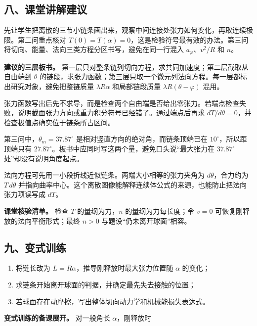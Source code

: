 \documentclass[12pt,a4paper,UTF8]{ctexart}
\newcommand{\tightlist}{\setlength{\itemsep}{0pt}\setlength{\parskip}{0pt}}
\begin{document}
\subsection{八、课堂讲解建议}\label{ux516bux8bfeux5802ux8bb2ux89e3ux5efaux8bae-6}

先让学生把离散的三节小链条画出来，观察中间连接处张力如何变化，再取连续极限。第二问重点核对
\(T(0)=T(\alpha)=0\)，这是检验符号最有效的办法。第三问将切向、能量、法向三类方程分区书写，避免在同一行混入
\(a_\varphi\)、\(v^2/R\) 和 \(n\)。

\textbf{建议的三层板书。}
第一层只对整条链列切向方程，求共同加速度；第二层截取从自由端到
\(\theta\)
的链段，求张力函数；第三层只取一个微元列法向方程。每一层都标出研究对象，避免把整链质量
\(\lambda R\alpha\) 和局部链段质量 \(\lambda R(\theta-\varphi)\) 混用。

张力函数写出后先不求导，而是检查两个自由端是否给出零张力。若端点检查失败，说明截面张力方向或重力积分符号已经错了。通过端点后再求
\(dT/d\theta=0\)，并检查极值点确实位于链条所占区间。

第三问中，\(\theta_m=37.87^\circ\)
是相对竖直方向的绝对角，而链条顶端已在 \(10^\circ\)，所以距顶端只有
\(27.87^\circ\)。板书中应同时写这两个量，避免口头说``最大张力在
\(37.87^\circ\) 处''却没有说明角度起点。

法向方程可先用一小段折线近似链条。两端大小相等的张力夹角为
\(d\theta\)，合力约为 \(T\,d\theta\)
并指向曲率中心。这个离散图像能解释连续体公式的来源，也能防止把法向张力项误写成
\(dT\)。

\textbf{课堂核验清单。} 检查 \(T\) 的量纲为力，\(n\)
的量纲为力每长度；令 \(v=0\) 可恢复刚释放的法向平衡形式；最终 \(n>0\)
与题设``仍未离开球面''相容。

\subsection{九、变式训练}\label{ux4e5dux53d8ux5f0fux8badux7ec3-6}

\begin{enumerate}
\def\labelenumi{\arabic{enumi}.}
\tightlist
\item
  将链长改为 \(L=R\alpha\)，推导刚释放时最大张力位置随 \(\alpha\)
  的变化；
\item
  求链条开始离开球面的判据，并确定最先失去接触的位置；
\item
  若球面存在动摩擦，写出整体切向动力学和机械能损失表达式。
\end{enumerate}

\textbf{变式训练的备课展开。} 对一般角长 \(\alpha\)，刚释放时
\end{document}
